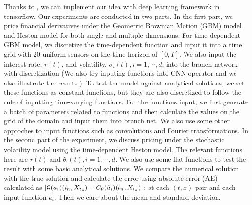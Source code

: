 \documentclass[11pt,a4paper]{article}
\theoremstyle{remark}
\begin{document}
	Thanks to \cite{tensorflow2015-whitepaper}, we can implement our idea with deep learning framework in tensorflow. Our experiments are conducted in two parts. In the first part, we price financial derivatives under the Geometric Brownian Motion (GBM) model and Heston model for both single and multiple dimensions. For time-dependent GBM model, we discretize the time-dependent function and input it into a time grid with 20 uniform sensors on the time horizon of $[0, T]$. We also input the interest rate, $r(t)$, and volatility, $\sigma_i(t), i=1,\cdots,d$, into the branch network with discretization (We also try inputing functions into CNN operator and we also illustrate the results.). To test the model against analytical solutions, we set these functions as constant functions, but they are also discretized to follow the rule of inputting time-varying functions. For the functions input, we first generate a batch of parameters related to functions and then calculate the values on the grid of the domain and input them into branch net. We also use some other approches to input functions such as convolutions and Fourier transformations. In the second part of the experiment, we discuss pricing under the stochastic volatility model using the time-dependent Heston model. The relevant functions here are $r(t)$ and $\theta_i(t), i=1,\cdots,d$. We also use some flat functions to test the result with some basic analytical solutions. We compare the numerical solution with the true solution and calculate the error using absolute error (AE) calculated as $|\mathcal{G}(a_i)(t_n, X_{t_n}) - G_{\theta}(\Tilde{a}_i)(t_n, X_{t_n})|$: at each $(t, x)$ pair and each input function $a_i$. Then we care about the mean and standard deviation.
	
\end{document}
